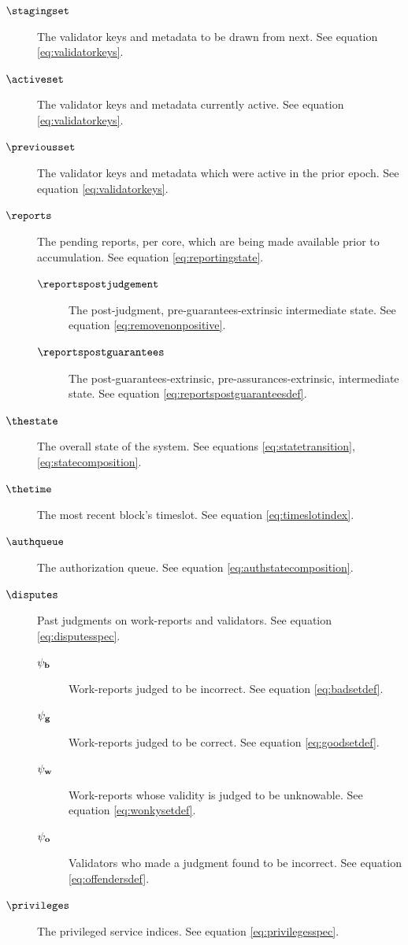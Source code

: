 \begin{description}
  \item[$\stagingset$] The validator keys and metadata to be drawn from next. See equation \ref{eq:validatorkeys}.
  \item[$\activeset$] The validator keys and metadata currently active. See equation \ref{eq:validatorkeys}.
  \item[$\previousset$] The validator keys and metadata which were active in the prior epoch. See equation \ref{eq:validatorkeys}.
  \item[$\reports$] The pending reports, per core, which are being made available prior to accumulation. See equation \ref{eq:reportingstate}.
  \begin{description}
    \item[$\reportspostjudgement$] The post-judgment, pre-guarantees-extrinsic intermediate state. See equation \ref{eq:removenonpositive}.
    \item[$\reportspostguarantees$] The post-guarantees-extrinsic, pre-assurances-extrinsic, intermediate state. See equation \ref{eq:reportspostguaranteesdef}.
  \end{description}
  \item[$\thestate$] The overall state of the system. See equations \ref{eq:statetransition}, \ref{eq:statecomposition}.
  \item[$\thetime$] The most recent block's timeslot. See equation \ref{eq:timeslotindex}.
  \item[$\authqueue$] The authorization queue. See equation \ref{eq:authstatecomposition}.
  \item[$\disputes$] Past judgments on work-reports and validators. See equation \ref{eq:disputesspec}.
  \begin{description}
    \item[$\psi_\mathbf{b}$] Work-reports judged to be incorrect. See equation \ref{eq:badsetdef}.
    \item[$\psi_\mathbf{g}$] Work-reports judged to be correct. See equation \ref{eq:goodsetdef}.
    \item[$\psi_\mathbf{w}$] Work-reports whose validity is judged to be unknowable. See equation \ref{eq:wonkysetdef}.
    \item[$\psi_\mathbf{o}$] Validators who made a judgment found to be incorrect. See equation \ref{eq:offendersdef}.
  \end{description}
  \item[$\privileges$] The privileged service indices. See equation \ref{eq:privilegesspec}.
  \begin{description}

\end{description}
\end{description}
